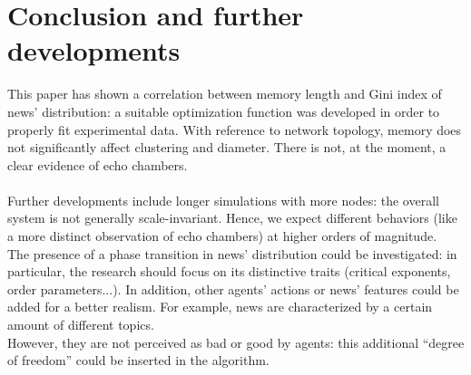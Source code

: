 \section{Conclusion and further developments}
This paper has shown a correlation between memory length and Gini
index of news' distribution: a suitable optimization function
was developed in order to properly fit experimental data.
With reference to network topology, memory does not significantly
affect clustering and diameter.
There is not, at the moment, a clear evidence of echo chambers.\\
\\
Further developments include longer simulations with more nodes:
the overall system is not generally scale-invariant.
Hence, we expect different behaviors (like a more
distinct observation
of echo chambers) at higher orders of magnitude.\\
The presence of a phase transition in news' distribution could be investigated: in particular, the research should focus on its distinctive traits (critical exponents, order parameters...). 
In addition, other agents' actions or news' features could be added for a better realism.
For example, news are characterized by a certain amount of different topics.\\
However, they are not perceived as bad or good by agents: this additional ``degree of freedom''
could be inserted in the algorithm.
